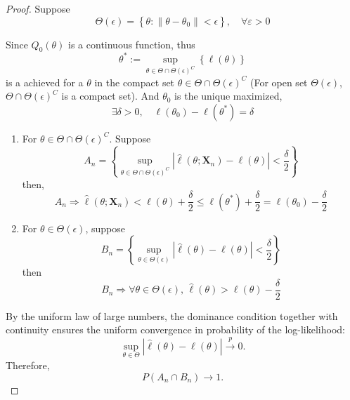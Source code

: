 \begin{proof}
	Suppose
	\begin{equation*}
		\Theta(\epsilon)=\left\{\theta:\left\|\theta-\theta_{0}\right\|<\epsilon\right\},\quad\forall\varepsilon>0
	\end{equation*}

	Since \(Q_{0}(\theta)\) is a continuous function, thus
	\begin{equation*}
		\theta^{*}:=\sup_{\theta\in\Theta\cap \Theta(\epsilon)^{C}}\left\{\ell(\theta)\right\}
	\end{equation*}
	is a achieved for a \(\theta\) in the compact set \(\theta\in\Theta\cap \Theta(\epsilon)^{C}\) (For open set \(\Theta(\epsilon)\), \(\Theta\cap\Theta(\epsilon)^{C}\) is a compact set). And \(\theta_{0}\) is the unique maximized,
	\begin{equation*}
		\exists\delta>0,\quad\ell\left(\theta_{0}\right)-\ell\left(\theta^{*}\right)=\delta
	\end{equation*}

	\begin{enumerate}
		\item For \(\theta\in\Theta\cap\Theta(\epsilon)^{C}\). Suppose
		      \begin{equation*}
			      A_{n}=\left\{\sup_{\theta\in\Theta\cap\Theta(\epsilon)^{C}}\left|\hat{\ell}\left(\theta;\textbf{X}_{n}\right)-\ell(\theta)\right|<\frac{\delta}{2}\right\}
		      \end{equation*}
		      then,
		      \begin{equation*}
			      A_{n}\Longrightarrow\hat{\ell}\left(\theta;\textbf{X}_{n}\right)<\ell(\theta)+\frac{\delta}{2}\leq \ell\left(\theta^{*}\right)+\frac{\delta}{2}=\ell\left(\theta_{0}\right)-\frac{\delta}{2}
		      \end{equation*}
		\item For \(\theta\in\Theta(\epsilon)\), suppose
		      \begin{equation*}
			      B_{n}=\left\{\sup_{\theta\in\Theta(\epsilon)}\left|\hat{\ell}\left(\theta\right)-\ell(\theta)\right|<\frac{\delta}{2}\right\}
		      \end{equation*}
		      then
		      \begin{equation*}
			      B_{n}\Longrightarrow\forall\theta\in\Theta(\epsilon),\,\hat{\ell}\left(\theta\right)>\ell(\theta)-\frac{\delta}{2}
		      \end{equation*}
	\end{enumerate}

	By the uniform law of large numbers, the dominance condition together with continuity ensures the uniform convergence in probability of the log-likelihood:
	\begin{equation*}
		\sup_{\theta\in\Theta}|\hat{\ell}(\theta)-\ell(\theta)|\stackrel{p}{\rightarrow}0.
	\end{equation*}
	Therefore,
	\begin{equation*}
		P\left(A_{n}\cap B_{n}\right)\rightarrow 1.
	\end{equation*}


\end{proof}
